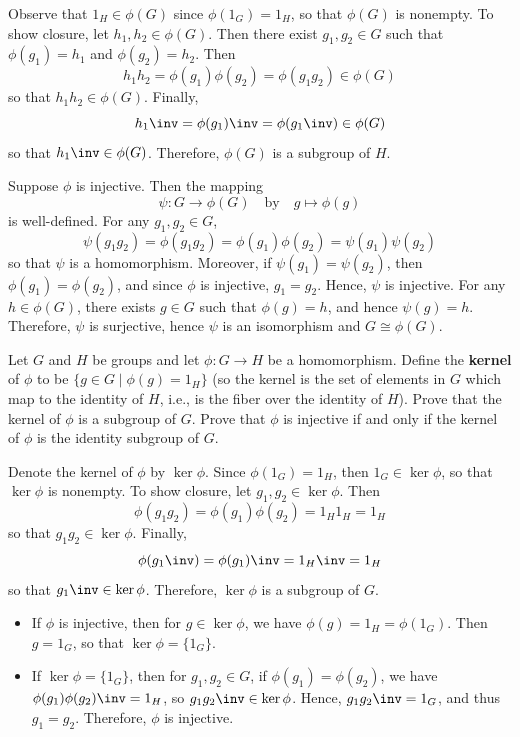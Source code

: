 \begin{sol}
    Observe that $1_H \in \phi(G)$ since $\phi(1_G) = 1_H$, so that $\phi(G)$ is nonempty. To show closure, let $h_1, h_2 \in \phi(G)$. Then there exist $g_1, g_2 \in G$ such that $\phi(g_1) = h_1$ and $\phi(g_2) = h_2$. Then
    \[h_1h_2 = \phi(g_1)\phi(g_2) = \phi(g_1g_2) \in \phi(G)\]
    so that $h_1h_2 \in \phi(G)$. Finally,
    \[h_1\inv = \phi(g_1)\inv = \phi(g_1\inv) \in \phi(G)\]
    so that $h_1\inv \in \phi(G)$. Therefore, $\phi(G)$ is a subgroup of $H$.

    Suppose $\phi$ is injective. Then the mapping
    \[\psi : G \to \phi(G) \quad \text{by} \quad g \mapsto \phi(g)\]
    is well-defined. For any $g_1, g_2 \in G$,
    \[\psi(g_1g_2) = \phi(g_1g_2) = \phi(g_1)\phi(g_2) = \psi(g_1)\psi(g_2)\]
    so that $\psi$ is a homomorphism. Moreover, if $\psi(g_1) = \psi(g_2)$, then $\phi(g_1) = \phi(g_2)$, and since $\phi$ is injective, $g_1 = g_2$. Hence, $\psi$ is injective. For any $h \in \phi(G)$, there exists $g \in G$ such that $\phi(g) = h$, and hence $\psi(g) = h$. Therefore, $\psi$ is surjective, hence $\psi$ is an isomorphism and $G \cong \phi(G)$.
\end{sol}

\begin{specialexercise}[Kernels] \label{ex1.6.14}
    Let $G$ and $H$ be groups and let $\phi : G \to H$ be a homomorphism. Define the \textbf{kernel} of $\phi$ to be $\{ g \in G \mid \phi(g) = 1_H \}$ (so the kernel is the set of elements in $G$ which map to the identity of $H$, i.e., is the fiber over the identity of $H$). Prove that the kernel of $\phi$ is a subgroup of $G$. Prove that $\phi$ is injective if and only if the kernel of $\phi$ is the identity subgroup of $G$.
\end{specialexercise}

\begin{sol}
    Denote the kernel of $\phi$ by $\ker\phi$. Since $\phi(1_G) = 1_H$, then $1_G \in \ker\phi$, so that $\ker\phi$ is nonempty. To show closure, let $g_1, g_2 \in \ker\phi$. Then
    \[\phi(g_1g_2) = \phi(g_1)\phi(g_2) = 1_H1_H = 1_H\]
    so that $g_1g_2 \in \ker\phi$. Finally,
    \[\phi(g_1\inv) = \phi(g_1)\inv = 1_H\inv = 1_H\]
    so that $g_1\inv \in \ker\phi$. Therefore, $\ker\phi$ is a subgroup of $G$.
    \begin{itemize}
        \item [\rightimp] If $\phi$ is injective, then for $g \in \ker\phi$, we have $\phi(g) = 1_H = \phi(1_G)$. Then $g = 1_G$, so that $\ker\phi = \{1_G\}$.
        \item [\leftimp] If $\ker\phi = \{1_G\}$, then for $g_1, g_2 \in G$, if $\phi(g_1) = \phi(g_2)$, we have $\phi(g_1)\phi(g_2)\inv = 1_H$, so $g_1g_2\inv \in \ker\phi$. Hence, $g_1g_2\inv = 1_G$, and thus $g_1 = g_2$. Therefore, $\phi$ is injective. \qh
    \end{itemize}
\end{sol}

